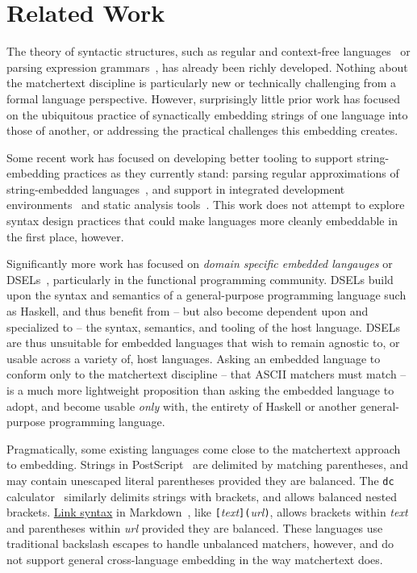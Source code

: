 \section{Related Work}
\label{sec:rel}

The theory of syntactic structures,
such as regular and
context-free languages~\cite{chomsky59algebraic}
or parsing expression grammars~\cite{ford04popl},
has already been richly developed.
Nothing about the matchertext discipline
is particularly new or technically challenging
from a formal language perspective.
However, surprisingly little prior work has focused on
the ubiquitous practice of synactically embedding
strings of one language into those of another,
or addressing the practical challenges this embedding creates.

Some recent work has focused on developing better tooling
to support string-embedding practices as they currently stand:
\eg parsing regular approximations
of string-embedded languages~\cite{verbitskaia15relaxed},
and support in
integrated development environments~\cite{grigorev14string}
and static analysis tools~\cite{khabibullin15development}.
This work does not attempt to explore syntax design practices
that could make languages more cleanly embeddable in the first place, however.

Significantly more work has focused on
\emph{domain specific embedded langauges}
or DSELs~\cite{hudak98modular},
particularly in the functional programming community.
DSELs build upon the syntax and semantics
of a general-purpose programming language such as Haskell,
and thus benefit from --
but also become dependent upon and specialized to --
the syntax, semantics, and tooling of the host language.
DSELs are thus unsuitable for embedded languages
that wish to remain agnostic to, or usable across a variety of,
host languages.
Asking an embedded language to conform only to the matchertext discipline --
that ASCII matchers must match --
is a much more lightweight proposition than
asking the embedded language to adopt, and become usable \emph{only} with,
the entirety of Haskell or another general-purpose programming language.

Pragmatically,
some existing languages come close to the matchertext approach to embedding.
Strings in PostScript~\cite{adobe99postscript}
are delimited by matching parentheses,
and may contain unescaped literal parentheses provided they are balanced.
The \verb|dc| calculator~\cite{howard21dc}
similarly delimits strings with brackets,
and allows balanced nested brackets.
\href{https://spec.commonmark.org/0.30/#links}{Link syntax}
in Markdown~\cite{macfarlane19commonmark},
like \verb|[|\emph{text}\verb|](|\emph{url}\verb|)|,
allows brackets within \emph{text}
and parentheses within \emph{url} provided they are balanced.
These languages use traditional backslash escapes to handle unbalanced matchers,
however,
and do not support general cross-language embedding
in the way matchertext does.

